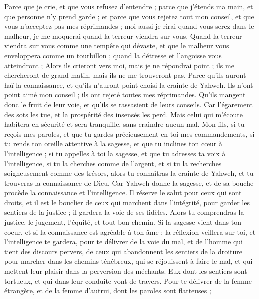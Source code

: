 \begin{multicols}{2}
Parce que je crie, et que vous refusez d’entendre ; parce que j’étends ma main, et que personne n’y prend garde ;
et parce que vous rejetez tout mon conseil, et que vous n'acceptez pas mes réprimandes ;
moi aussi je rirai quand vous serez dans le malheur, je me moquerai quand la terreur viendra sur vous.
Quand la terreur viendra sur vous comme une tempête qui dévaste, et que le malheur vous enveloppera comme un tourbillon ; quand la détresse et l'angoisse vous atteindront ;
Alors ils crieront vers moi, mais je ne répondrai point ; ils me chercheront de grand matin, mais ils ne me trouveront pas.
Parce qu'ils auront haï la connaissance, et qu'ils n'auront point choisi la crainte de Yahweh.
Ils n'ont point aimé mon conseil ; ils ont rejeté toutes mes réprimandes.
Qu'ils mangent donc le fruit de leur voie, et qu'ils se rassasient de leurs conseils.
Car l’égarement des sots les tue, et la prospérité des insensés les perd.
Mais celui qui m'écoute habitera en sécurité et sera tranquille, sans craindre aucun mal.
\VerseOne{}Mon fils, si tu reçois mes paroles, et que tu gardes précieusement en toi mes commandements,
si tu rends ton oreille attentive à la sagesse, et que tu inclines ton cœur à l'intelligence ;
si tu appelles à toi la sagesse, et que tu adresses ta voix à l'intelligence,
si tu la cherches comme de l'argent, et si tu la recherches soigneusement comme des trésors,
alors tu connaîtras la crainte de Yahweh, et tu trouveras la connaissance de Dieu.
Car Yahweh donne la sagesse, et de sa bouche procède la connaissance et l'intelligence.
Il réserve le salut pour ceux qui sont droits, et il est le bouclier de ceux qui marchent dans l'intégrité,
pour garder les sentiers de la justice ; il gardera la voie de ses fidèles.
Alors tu comprendras la justice, le jugement, l'équité, et tout bon chemin.
Si la sagesse vient dans ton coeur, et si la connaissance est agréable à ton âme ;
la réflexion veillera sur toi, et l'intelligence te gardera,
pour te délivrer de la voie du mal, et de l'homme qui tient des discours pervers,
de ceux qui abandonnent les sentiers de la droiture pour marcher dans les chemins ténébreux,
qui se réjouissent à faire le mal, et qui mettent leur plaisir dans la perversion des méchants.
Eux dont les sentiers sont tortueux, et qui dans leur conduite vont de travers.
Pour te délivrer de la femme étrangère, et de la femme d'autrui, dont les paroles sont flatteuses ;

\end{multicols}
